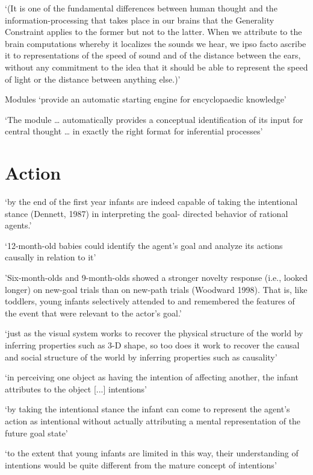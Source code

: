 \documentclass[12pt]{extarticle}
\begin{document}
\begin{multicols}{3}
‘(It is one of the fundamental differences between human thought and the information-processing that takes place in our brains that the Generality Constraint applies to the former but not to the latter. When we attribute to the brain computations whereby it localizes the sounds we hear, we ipso facto ascribe it to representations of the speed of sound and of the distance between the ears, without any commitment to the idea that it should be able to represent the speed of light or the distance between anything else.)’
\citep[p.\ 104, footnote 22]{Evans:1982je}
 
Modules ‘provide an automatic starting engine for encyclopaedic knowledge’
\citep[p.\ 194]{Leslie:1988ct}
 
‘The module … automatically provides a conceptual identification of its input for central thought … in exactly the right format for inferential processes’
\citep[p.\ 193--4]{Leslie:1988ct}
 
 
 
\section{Action}
 
‘by the end of the first year infants are indeed capable of taking the intentional stance (Dennett, 1987) in interpreting the goal- directed behavior of rational agents.’
\citep[p.\ 184]{Gergely:1995sq}
 
‘12-month-old babies could identify the agent’s goal and analyze its actions causally in relation to it’
\citep[p.\ 190]{Gergely:1995sq}
 
'Six-month-olds and 9-month-olds showed a stronger novelty response (i.e., looked longer) on new-goal trials than on new-path trials (Woodward 1998). That is, like toddlers, young infants selectively attended to and remembered the features of the event that were relevant to the actor’s goal.'
\citep[p.\ 153]{woodward:2001_making}
 
‘just as the visual system works to recover the physical structure of the world by inferring properties such as 3-D shape, so too does it work to recover the causal and social structure of the world by inferring properties such as causality’
\citep[p.\ 299]{Scholl:2000eq}
 
‘in perceiving one object as having the intention of affecting another, the infant attributes to the object [...] intentions’
\citep[p.\ 14]{Premack:1990jl}
 
‘by taking the intentional stance the infant can come to represent the agent’s action as intentional without actually attributing a mental representation of the future goal state’
\citep[p.\ 188]{Gergely:1995sq}
 
‘to the extent that young infants are limited in this way, their understanding of intentions would be quite different from the mature concept of intentions’
\citep[p.\ 168]{woodward:2001_making}
 

 
 
\footnotesize 


\end{multicols}
\end{document}
